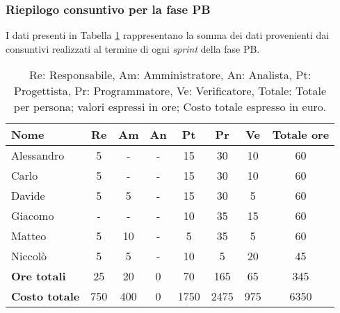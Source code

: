 \subsubsection{Riepilogo consuntivo per la fase PB}
I dati presenti in Tabella \ref{t:consuntivoPB} rappresentano la somma dei dati provenienti dai consuntivi realizzati al termine di ogni \textit{sprint} della fase PB.
\begin{table}[H]
	\centering
	\begin{tabular}{l|c|c|c|c|c|c|c}
		\textbf{Nome}         & \textbf{Re} & \textbf{Am} & \textbf{An} & \textbf{Pt} & \textbf{Pr} & \textbf{Ve} & \textbf{Totale ore} \\
		\hline
		Alessandro            & 5           & -           & -           & 15          & 30          & 10          & 60                  \\
		Carlo                 & 5           & -           & -           & 15          & 30          & 10          & 60                  \\
		Davide                & 5           & 5           & -           & 15          & 30          & 5           & 60                  \\
		Giacomo               & -           & -           & -           & 10          & 35          & 15          & 60                  \\
		Matteo                & 5           & 10          & -           & 5           & 35          & 5           & 60                  \\
		Niccolò               & 5           & 5           & -           & 10          & 5           & 20          & 45                  \\
		\hline
		\textbf{Ore totali}   & 25          & 20          & 0           & 70          & 165         & 65          & 345                 \\
		\textbf{Costo totale} & 750         & 400         & 0           & 1750        & 2475        & 975         & 6350
	\end{tabular}
	\caption{Re: Responsabile, Am: Amministratore, An: Analista, Pt: Progettista, Pr: Programmatore, Ve: Verificatore, Totale: Totale per persona; valori espressi in ore; Costo totale espresso in euro.}
	\label{t:consuntivoPB}

\end{table}


